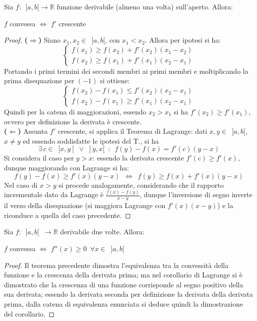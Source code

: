 \documentclass[10pt, oneside]{book}
\theoremstyle{plain}
\begin{document}
\begin{ther}
Sia $f : \enspace ]a, b[ \rightarrow \mathbb{R}$ funzione derivabile (almeno una volta) sull'aperto. Allora:
\begin{center}
    $f$ convessa $\Longleftrightarrow$ $f'$ crescente
\end{center}
\end{ther}
\begin{proof}
\textbf{($\Rightarrow$)} Siano $x_1, x_2 \in \enspace ]a, b[$, con $x_1 < x_2$. Allora per ipotesi si ha:
\[\begin{cases}
f(x_1) \geq f(x_2) + f'(x_2) (x_1 - x_2) \\
f(x_2) \geq f(x_1) + f'(x_1) (x_2 - x_1) 
\end{cases}\]
Portando i primi termini dei secondi membri ai primi membri e moltiplicando la prima disequazione per $(-1)$ si ottiene:
\[\begin{cases}
f(x_2) - f(x_1) \leq f'(x_2) (x_2 - x_1) \\
f(x_2) - f(x_1) \geq f'(x_1) (x_2 - x_1) 
\end{cases}\]
Quindi per la catena di maggiorazioni, essendo $x_2 > x_1$ si ha $f'(x_2) \geq f'(x_1)$, ovvero per definizione la derivata è crescente.\\
\textbf{($\Leftarrow$)} Assunta $f'$ crescente, si applica il Teorema di Lagrange: dati $x, y \in \enspace ]a, b[$, $x \neq y$ ed essendo soddisfatte le ipotesi del T., si ha
\[\exists \, c \in \enspace ]x, y[ \, \, \lor \, \, ]y, x[ \enspace : \enspace f(y) - f(x) = f'(c) (y - x)\]
Si considera il caso per $y > x$: essendo la derivata crescente $f'(c) \geq f'(x)$, dunque maggiorando con Lagrange si ha:
\[f(y) - f(x) \geq f'(x) (y - x) \enspace \Leftrightarrow \enspace f(y) \geq f(x) + f'(x) (y - x)\]
Nel caso di $x > y$ si procede analogamente, considerando che il rapporto incrementale dato da Lagrange è $\displaystyle \frac{f(x) - f(y)}{x - y}$, dunque l'inversione di segno inverte il verso della disequazione (si maggiora Lagrange con $f'(x) (x - y)$) e la riconduce a quella del caso precedente.
\end{proof}

\begin{cor}
Sia $f : \enspace ]a, b[ \enspace \rightarrow \mathbb{R}$ derivabile due volte. Allora:
\begin{center}
$f$ convessa $\Longleftrightarrow$ $f''(x) \geq 0 \enspace \forall x \in \enspace ]a, b[$
\end{center}
\end{cor}
\begin{proof}
Il teorema precedente dimostra l'equivalenza tra la convessità della funzione e la crescenza della derivata prima; ma nel corollario di Lagrange si è dimostrato che la crescenza di una funzione corrisponde al segno positivo della sua derivata; essendo la derivata seconda per definizione la derivata della derivata prima, dalla catena di equivalenza enunciata si deduce quindi la dimostrazione del corollario.
\end{proof}
\end{document}
